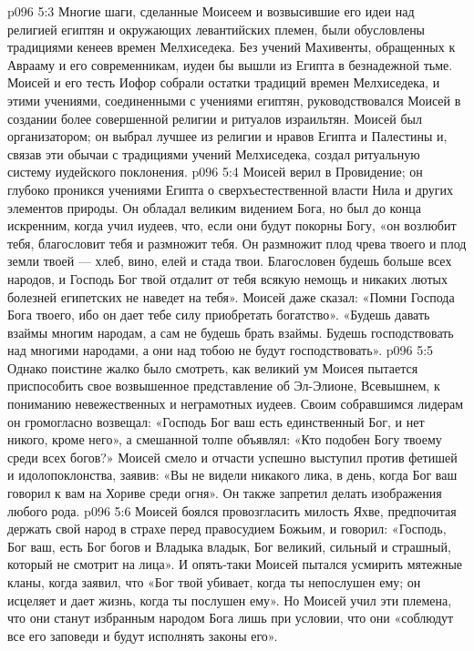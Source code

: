 \vs p096 5:3 Многие шаги, сделанные Моисеем и возвысившие его идеи над религией египтян и окружающих левантийских племен, были обусловлены традициями кенеев времен Мелхиседека. Без учений Махивенты, обращенных к Аврааму и его современникам, иудеи бы вышли из Египта в безнадежной тьме. Моисей и его тесть Иофор собрали остатки традиций времен Мелхиседека, и этими учениями, соединенными с учениями египтян, руководствовался Моисей в создании более совершенной религии и ритуалов израильтян. Моисей был организатором; он выбрал лучшее из религии и нравов Египта и Палестины и, связав эти обычаи с традициями учений Мелхиседека, создал ритуальную систему иудейского поклонения.
\vs p096 5:4 \pc Моисей верил в Провидение; он глубоко проникся учениями Египта о сверхъестественной власти Нила и других элементов природы. Он обладал великим видением Бога, но был до конца искренним, когда учил иудеев, что, если они будут покорны Богу, «он возлюбит тебя, благословит тебя и размножит тебя. Он размножит плод чрева твоего и плод земли твоей --- хлеб, вино, елей и стада твои. Благословен будешь больше всех народов, и Господь Бог твой отдалит от тебя всякую немощь и никаких лютых болезней египетских не наведет на тебя». Моисей даже сказал: «Помни Господа Бога твоего, ибо он дает тебе силу приобретать богатство». «Будешь давать взаймы многим народам, а сам не будешь брать взаймы. Будешь господствовать над многими народами, а они над тобою не будут господствовать».
\vs p096 5:5 \pc Однако поистине жалко было смотреть, как великий ум Моисея пытается приспособить свое возвышенное представление об Эл\hyp{}Элионе, Всевышнем, к пониманию невежественных и неграмотных иудеев. Своим собравшимся лидерам он громогласно возвещал: «Господь Бог ваш есть единственный Бог, и нет никого, кроме него», а смешанной толпе объявлял: «Кто подобен Богу твоему среди всех богов?» Моисей смело и отчасти успешно выступил против фетишей и идолопоклонства, заявив: «Вы не видели никакого лика, в день, когда Бог ваш говорил к вам на Хориве среди огня». Он также запретил делать изображения любого рода.
\vs p096 5:6 Моисей боялся провозгласить милость Яхве, предпочитая держать свой народ в страхе перед правосудием Божьим, и говорил: «Господь, Бог ваш, есть Бог богов и Владыка владык, Бог великий, сильный и страшный, который не смотрит на лица». И опять\hyp{}таки Моисей пытался усмирить мятежные кланы, когда заявил, что «Бог твой убивает, когда ты непослушен ему; он исцеляет и дает жизнь, когда ты послушен ему». Но Моисей учил эти племена, что они станут избранным народом Бога лишь при условии, что они «соблюдут все его заповеди и будут исполнять законы его».
